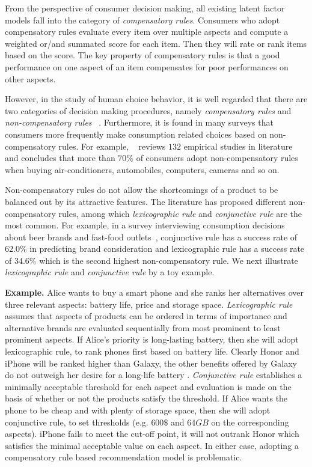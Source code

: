 \documentclass[letterpaper]{article} %
\begin{document}
From the perspective of consumer decision making, all existing latent factor models fall into the category of \emph{compensatory rules}. Consumers who adopt compensatory rules evaluate every item over multiple aspects and compute a weighted or/and summated score for each item. Then they will rate or rank items based on the score. The key property of compensatory rules is that a good performance on one aspect of an item compensates for poor performances on other aspects. 


However, in the study of human choice behavior, it is well regarded that there are two categories of decision making procedures, namely \emph{compensatory rules} and \emph{non-compensatory rules}~\cite{Engel1986Consumer} . Furthermore, it is found in many surveys that consumers more frequently make consumption related choices based on non-compensatory rules. For example, ~\cite{Hauser2009Non} reviews $132$ empirical studies in literature and  concludes that more than $70\%$ of consumers adopt non-compensatory rules when buying air-conditioners, automobiles, computers, cameras and so on. 

Non-compensatory rules do not allow the shortcomings of a product to be balanced out by its attractive features. The literature has proposed different non-compensatory rules, among which  \emph{lexicographic rule} and \emph{conjunctive rule} are the most common. For example, in a survey interviewing consumption decisions about beer brands and fast-food outlets~\cite{Laroche2003Which}, conjunctive rule has a success rate of $62.0\%$ in predicting brand consideration and lexicographic rule has a success rate of $34.6\%$ which is the second highest non-compensatory rule. We next illustrate  \emph{lexicographic rule} and \emph{conjunctive rule}  by a toy example. 

\textbf{Example.} Alice wants to buy a smart phone and she ranks her alternatives over three relevant aspects: battery life, price and storage space. \emph{Lexicographic rule} assumes that aspects of products can be ordered in terms of importance and alternative brands are evaluated sequentially from most prominent to least prominent aspects.  If Alice's priority is long-lasting battery, then she will adopt lexicographic rule, to rank phones first based on battery life. Clearly Honor and iPhone will be ranked higher than Galaxy, the other benefits offered by Galaxy  do not outweigh her desire for a long-life battery . \emph{Conjunctive rule} establishes a minimally acceptable threshold for each aspect and evaluation is made on the basis of whether or not the products satisfy the threshold. If Alice wants the phone to be cheap and with plenty of storage space, then she will adopt conjunctive rule, to set thresholds (e.g. $600\$$ and $64GB$ on the corresponding aspects). iPhone fails to meet the cut-off point, it will not outrank Honor which satisfies the minimal acceptable value on each aspect. In either case, adopting a compensatory rule based recommendation model is problematic. 
\end{document}
